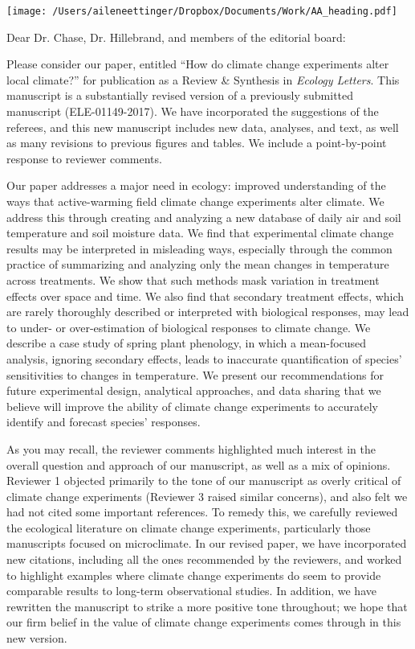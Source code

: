 \documentclass[11pt,a4paper]{letter}
\begin{document}


\begin{letter}{}
\texttt{[image: /Users/aileneettinger/Dropbox/Documents/Work/AA\_heading.pdf]}

\opening{Dear Dr. Chase, Dr. Hillebrand, and members of the editorial board:}
Please consider our paper, entitled ``How do climate change experiments alter local climate?'' for publication as a Review \& Synthesis in \emph{Ecology Letters}. This manuscript is a substantially revised version of a previously submitted manuscript  (ELE-01149-2017). We have incorporated the suggestions of the referees, and this new manuscript includes new data, analyses, and text, as well as many revisions to previous figures and tables. We include a point-by-point response to reviewer comments.

Our paper addresses a major need in ecology: improved understanding of the ways that active-warming field climate change experiments alter climate. We address this through creating and analyzing a new database of daily air and soil temperature and soil moisture data.  We find that experimental climate change results may be interpreted in misleading ways, especially through the common practice of summarizing and analyzing only the mean changes in temperature across treatments.  We show that such methods mask variation in treatment effects over space and time. We also find that secondary treatment effects, which are rarely thoroughly described or interpreted with biological responses, may lead to under- or over-estimation of biological responses to climate change. We describe a case study of spring plant phenology, in which a mean-focused analysis, ignoring secondary effects, leads to inaccurate quantification of species' sensitivities to changes in temperature. We present our recommendations for future experimental design, analytical approaches, and data sharing that we believe will improve the ability of climate change experiments to accurately identify and forecast species' responses.

As you may recall, the reviewer comments highlighted much interest in the overall question and approach of our manuscript, as well as a mix of opinions.  Reviewer 1 objected primarily to the tone of our manuscript as overly critical of climate change experiments (Reviewer 3 raised similar concerns), and also felt we had not cited some important references. To remedy this, we carefully reviewed the ecological literature on climate change experiments, particularly those manuscripts focused on microclimate. In our revised paper, we have incorporated new citations, including all the ones recommended by the reviewers, and worked to highlight examples where climate change experiments do seem to provide comparable results to long-term observational studies. In addition, we have rewritten the manuscript to strike a more positive tone throughout; we hope that our firm belief in the value of climate change experiments comes through in this new version.


\end{letter}
\end{document}

